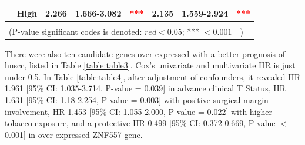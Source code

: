 \documentclass[cancers,article,submit,moreauthors,pdftex]{Definitions/mdpi}
\begin{document}
\begin{table}[hp]
{\begin{tabular}{|l|l|l|l|l|l|l|l|}
\cline{2-8}
                                        & High                                                                                & 2.266                                                                          & 1.666-3.082                                                                   & \multicolumn{1}{c|}{\textcolor{red}{***}}                                     & 2.135                                                                          & 1.559-2.924                                                                   & \multicolumn{1}{c|}{\textcolor{red}{***}}                                      \\ 
\hline
\multicolumn{8}{|l|}{}                                                                                                                                                                                                                                                                                                                                                                                                                                                                                                                                                                                                           \\ 
\hline
\multicolumn{8}{|l|}{(P-value significant codes is denoted: $red<0.05$; *** $<0.001$~~)}                                                                                                                                                                                                                                                                                                                                                                                                                                                                                                                                           \\
\hline
\end{tabular}
}
\label{table:table2}
\end{table}




There were also ten candidate genes over-expressed with a better prognosis of \acrshort{hnscc}, listed in Table \ref{table:table3}. Cox's univariate and multivariate HR is just under 0.5.
In Table \ref{table:table4},
after adjustment of confounders, it revealed HR 1.961 [95\% CI: 1.035-3.714, P-value = 0.039] in advance clinical T Status, HR 1.631 [95\% CI: 1.18-2.254, P-value = 0.003] with positive surgical margin involvement, HR 1.453 [95\% CI: 1.055-2.000, P-value = 0.022] with higher tobacco exposure, and a protective HR 0.499 [95\% CI: 0.372-0.669, P-value $<$ 0.001] in over-expressed \acrshort{ZNF557} gene.
\end{document}

